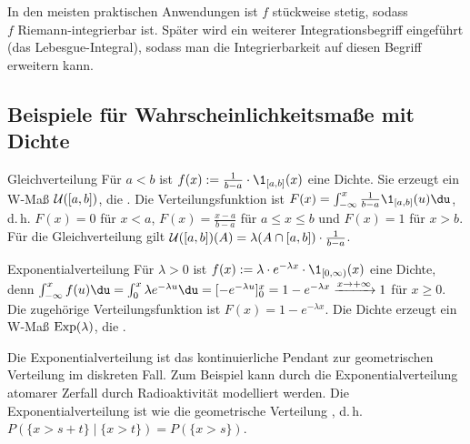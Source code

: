 \begin{Bem}
    In den meisten praktischen Anwendungen ist $f$ stückweise stetig, sodass\\
    $f$ Riemann-integrierbar ist.
    Später wird ein weiterer Integrationsbegriff eingeführt\\
    (das Lebesgue-Integral), sodass man die Integrierbarkeit auf diesen Begriff erweitern kann.
\end{Bem}

\subsection{%
    Beispiele für Wahrscheinlichkeitsmaße mit Dichte%
}

\begin{Def}{Gleichverteilung}
    Für $a < b$ ist $f(x) := \frac{1}{b - a} \cdot \1_{[a,b]}(x)$ eine Dichte.
    Sie erzeugt ein W-Maß $\mathcal{U}([a, b])$,
    die .
    Die Verteilungsfunktion ist $F(x) = \int_{-\infty}^x \frac{1}{b - a} \1_{[a, b]}(u) \du$,
    d.\,h. $F(x) = 0$ für $x < a$, $F(x) = \frac{x - a}{b - a}$ für $a \le x \le b$
    und $F(x) = 1$ für $x > b$.
    Für die Gleichverteilung gilt $\mathcal{U}([a, b])(A) = \lambda(A \cap [a, b]) \cdot \frac{1}{b - a}$.
\end{Def}

\linie

\begin{Def}{Exponentialverteilung}
    Für $\lambda > 0$ ist $f(x) := \lambda \cdot e^{-\lambda x} \cdot \1_{[0, \infty)}(x)$
    eine Dichte, denn $\int_{-\infty}^x f(u)\du = \int_0^x \lambda e^{-\lambda u} \du =
    [-e^{-\lambda u}]_0^x = 1 - e^{-\lambda x} \xrightarrow{x \to +\infty} 1$ für $x \ge 0$.
    Die zugehörige Verteilungsfunktion ist $F(x) = 1 - e^{-\lambda x}$.
    Die Dichte erzeugt ein W-Maß $\text{Exp}(\lambda)$,
    die .
\end{Def}

\begin{Bem}
    Die Exponentialverteilung ist das kontinuierliche Pendant zur geometrischen Verteilung im
    diskreten Fall.
    Zum Beispiel kann durch die Exponentialverteilung atomarer Zerfall durch Radioaktivität
    modelliert werden.
    Die Exponentialverteilung ist wie die geometrische Verteilung , d.\,h.
    $P(\{x > s + t\} \;|\; \{x > t\}) = P(\{x > s\})$.
\end{Bem}

